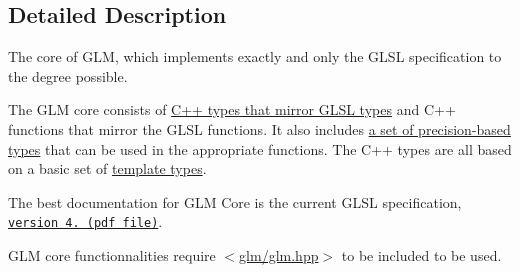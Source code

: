 \subsection{Detailed Description}
The core of G\+LM, which implements exactly and only the G\+L\+SL specification to the degree possible. 

The G\+LM core consists of \hyperlink{group__core__types}{C++ types that mirror G\+L\+SL types} and C++ functions that mirror the G\+L\+SL functions. It also includes \hyperlink{group__core__precision}{a set of precision-\/based types} that can be used in the appropriate functions. The C++ types are all based on a basic set of \hyperlink{group__core__template}{template types}.

The best documentation for G\+LM Core is the current G\+L\+SL specification, \href{http://www.opengl.org/registry/doc/GLSLangSpec.4.20.8.clean.pdf}{\tt version 4. (pdf file)}.

G\+LM core functionnalities require $<$\hyperlink{glm_8hpp}{glm/glm.\+hpp}$>$ to be included to be used. 